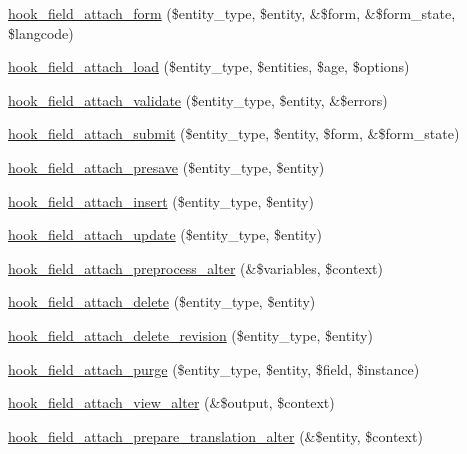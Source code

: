 \label{_amgrpd41d8cd98f00b204e9800998ecf8427e}
 \begin{DoxyCompactItemize}
\item 
\hyperlink{group__field__attach_ga34b24a5a84763be5c6b9d214b1e81d93}{hook\_\-field\_\-attach\_\-form} (\$entity\_\-type, \$entity, \&\$form, \&\$form\_\-state, \$langcode)
\item 
\hyperlink{group__field__attach_gaf684402532a3eaebecc456c751142903}{hook\_\-field\_\-attach\_\-load} (\$entity\_\-type, \$entities, \$age, \$options)
\item 
\hyperlink{group__field__attach_ga59269788b50bdcc28d42ad25907db1a5}{hook\_\-field\_\-attach\_\-validate} (\$entity\_\-type, \$entity, \&\$errors)
\item 
\hyperlink{group__field__attach_ga368ea58ca800b1e1f69f4b88e82f9ae0}{hook\_\-field\_\-attach\_\-submit} (\$entity\_\-type, \$entity, \$form, \&\$form\_\-state)
\item 
\hyperlink{group__field__attach_gab245c28e50df239cde3a566806ee74db}{hook\_\-field\_\-attach\_\-presave} (\$entity\_\-type, \$entity)
\item 
\hyperlink{group__field__attach_ga1a964f8aff654dca906c8784ba367115}{hook\_\-field\_\-attach\_\-insert} (\$entity\_\-type, \$entity)
\item 
\hyperlink{group__field__attach_gab8036ab794b9c28993e2414b7829caf1}{hook\_\-field\_\-attach\_\-update} (\$entity\_\-type, \$entity)
\item 
\hyperlink{group__field__attach_ga0d592a702a05792a8549ae777db00792}{hook\_\-field\_\-attach\_\-preprocess\_\-alter} (\&\$variables, \$context)
\item 
\hyperlink{group__field__attach_gac9e5a9e43f1290315db8b593b9516094}{hook\_\-field\_\-attach\_\-delete} (\$entity\_\-type, \$entity)
\item 
\hyperlink{group__field__attach_ga99f52991e1d235aa3c57d21778b4b595}{hook\_\-field\_\-attach\_\-delete\_\-revision} (\$entity\_\-type, \$entity)
\item 
\hyperlink{group__field__attach_ga096a9ba58b47bf4c2aa7e0f80e136ced}{hook\_\-field\_\-attach\_\-purge} (\$entity\_\-type, \$entity, \$field, \$instance)
\item 
\hyperlink{group__field__attach_ga0c415aacfd70903f556fb67517dfe1ee}{hook\_\-field\_\-attach\_\-view\_\-alter} (\&\$output, \$context)
\item 
\hyperlink{group__field__attach_ga497cd230a4a6bf6318784f6cf08e3758}{hook\_\-field\_\-attach\_\-prepare\_\-translation\_\-alter} (\&\$entity, \$context)

\end{DoxyCompactItemize}
